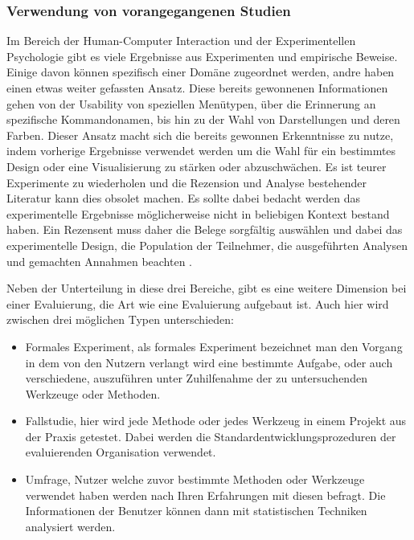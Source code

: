 \documentclass[draft=false
              ,paper=a4
              ,twoside=false
              ,fontsize=11pt
              ,headsepline
              ,BCOR10mm
              ,DIV11
              ]{scrbook}
\newcommand{\TODO}[1]{\colorbox{yellow}{\textcolor{red}{[TODO: #1]}}}
\begin{document}
\subsubsection{Verwendung von vorangegangenen Studien} %
\label{ssub:verwendung_von_vorangegangenen_studien}
Im Bereich der Human-Computer Interaction und der Experimentellen Psychologie gibt es viele Ergebnisse aus Experimenten und empirische Beweise. Einige davon können spezifisch einer Domäne zugeordnet werden, andre haben einen etwas weiter gefassten Ansatz. Diese bereits gewonnenen Informationen gehen von der Usability von speziellen Menütypen, über die Erinnerung an spezifische Kommandonamen, bis hin zu der Wahl von Darstellungen und deren Farben.
Dieser Ansatz macht sich die bereits gewonnen Erkenntnisse zu nutze, indem vorherige Ergebnisse verwendet werden um die Wahl für ein bestimmtes Design oder eine Visualisierung zu stärken oder abzuschwächen. Es ist teurer Experimente zu wiederholen und die Rezension und Analyse bestehender Literatur kann dies obsolet machen. Es sollte dabei bedacht werden das experimentelle Ergebnisse möglicherweise nicht in beliebigen Kontext bestand haben. Ein Rezensent muss daher die Belege sorgfältig auswählen und dabei das experimentelle Design, die Population der Teilnehmer, die ausgeführten Analysen und gemachten Annahmen beachten \cite{alan_dix_human-computer_2004}. 

\iffalse%
Neben der Unterteilung in diese drei Bereiche, gibt es eine weitere Dimension bei einer Evaluierung, die Art wie eine Evaluierung aufgebaut ist. Auch hier wird zwischen drei möglichen Typen unterschieden:

\begin{itemize}
  \item Formales Experiment, als formales Experiment bezeichnet man den Vorgang in dem von den Nutzern verlangt wird eine bestimmte Aufgabe, oder auch verschiedene, auszuführen unter Zuhilfenahme der zu untersuchenden Werkzeuge oder Methoden. 
  \item Fallstudie, hier wird jede Methode oder jedes Werkzeug in einem Projekt aus der Praxis getestet. Dabei werden die Standardentwicklungsprozeduren der evaluierenden Organisation verwendet.
  \item Umfrage, Nutzer welche zuvor bestimmte Methoden oder Werkzeuge verwendet haben werden nach Ihren Erfahrungen mit diesen befragt. Die Informationen der Benutzer können dann mit statistischen Techniken analysiert werden. 

\end{itemize}
\end{document}
